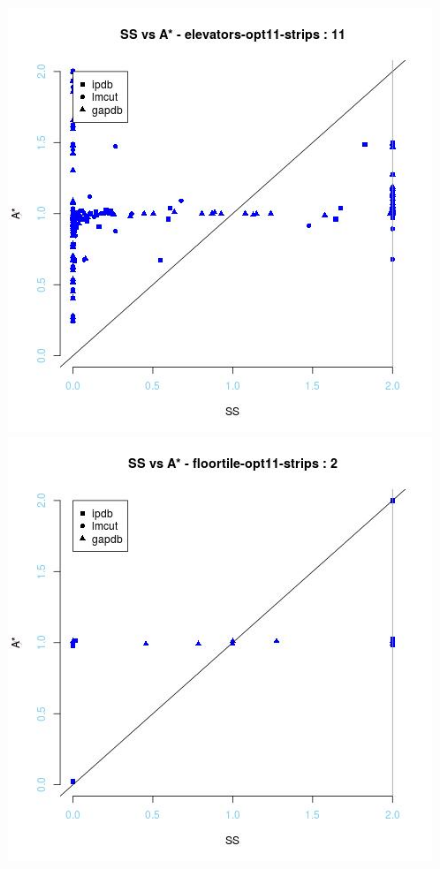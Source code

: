 \begin{figure}[!htb]
  \includegraphics[width=\linewidth]{images/elevators-opt11-strips}
\endminipage\hfill
{}
  \includegraphics[width=\linewidth]{images/floortile-opt11-strips}

\end{figure}
